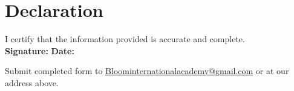 \documentclass[a4paper,12pt]{article}
\begin{document}
\section*{Declaration}
I certify that the information provided is accurate and complete. \\
\vspace{0.5cm}
\textbf{Signature:} \hrulefill \quad \textbf{Date:} \hrulefill

\vspace{1cm}
{\small Submit completed form to \href{mailto:Bloominternationalacademy@gmail.com}{Bloominternationalacademy@gmail.com} or at our address above.}
\end{document}
